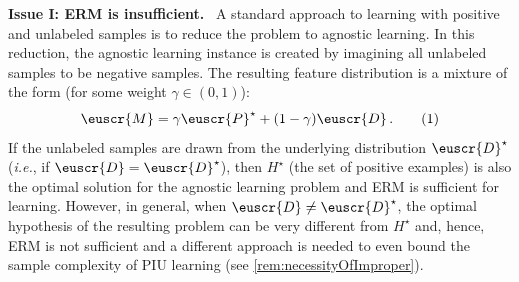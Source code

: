 \documentclass[11pt]{article}
\theoremstyle{plain}
\theoremstyle{definition}
\theoremstyle{remark}
\newcommand{\yesnum}{\addtocounter{equation}{1}\tag{\theequation}}
\newcommand{\customcal}[1]{\euscr{#1}}
\newcommand{\cD}{\customcal{D}}
\newcommand{\cM}{\customcal{M}}
\newcommand{\cP}{\customcal{P}}
\renewcommand{\paragraph}[1]{\medskip \noindent\textbf{#1}~}
\newcommand{\ie}{\textit{i.e.}}
\newcommand{\optset}{{H^\star}}
\newcommand{\cDtrue}{\cD^\star}
\newcommand{\cPtrue}{\cP^\star}
\begin{document}
        \paragraph{{Issue I: ERM is insufficient}.}
            A standard approach to learning with positive and unlabeled samples is to reduce the problem to agnostic learning.
            In this reduction, the agnostic learning instance is created by imagining all unlabeled samples to be negative samples.
            The resulting feature distribution is a mixture of the form (for some weight $\gamma\in (0,1)$):
            \[
                \cM = \gamma \cPtrue + (1-\gamma) \cD\,.
                \yesnum\label{eq:overview:mixture}
            \]
            If the unlabeled samples are drawn from the underlying distribution $\cDtrue$ (\ie{}, if $\cD=\cDtrue$), then $\optset$ (the set of positive examples) is also the optimal solution for the agnostic learning problem and ERM is sufficient for learning.
            However, in general, when $\cD \neq \cDtrue$, the optimal hypothesis of the resulting problem can be very different from $\optset$ and, hence, ERM is not sufficient and a different approach is needed to even bound the sample complexity of PIU learning (see \cref{rem:necessityOfImproper}).
            
            
            
\end{document}
